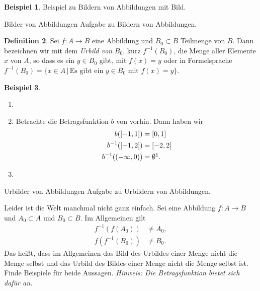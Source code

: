 \documentclass[a4paper,ngerman,12pt]{zirkelblatt1415}
\theoremstyle{definition}
\newtheorem{definition}{Definition}
\newtheorem{beispiel}[definition]{Beispiel}
\theoremstyle{remark}
\begin{document}
\begin{beispiel}
  Beispiel zu Bildern von Abbildungen mit Bild.
\end{beispiel}

\begin{aufgabe}{Bilder von Abbildungen}
  Aufgabe zu Bildern von Abbildungen.
\end{aufgabe}

\begin{definition}
Sei $f:A\longrightarrow B$ eine Abbildung und $B_0\subset B$ Teilmenge von $B$. Dann bezeichnen wir mit dem \emph{Urbild von} $B_0$, kurz $f^{-1}(B_0)$, die Menge aller Elemente 
$x$ von $A$, so dass es ein $y\in B_0$ gibt, mit $f(x)=y$ oder in Formelsprache
$f^{-1}(B_0) = \{x\in A\,|\,\text{Es gibt ein } y\in B_0 \text{ mit } f(x) =y\}.$ 
\end{definition}

\begin{beispiel}
\begin{enumerate}
\item
\item Betrachte die Betragsfunktion $b$ von vorhin. Dann haben wir
\begin{align*}
b([-1,1]) &=  [0,1] \\
b^{-1}([-1,2]) &= [-2,2]\\
b^{-1}((-\infty, 0)) &= \emptyset\footnotemark.
\end{align*}
\item
\end{enumerate}
\end{beispiel}

\begin{aufgabe}{Urbilder von Abbildungen}
  Aufgabe zu Urbildern von Abbildungen.
\end{aufgabe}

\begin{aufgabe}{Leider ist die Welt manchmal nicht ganz einfach.}
Sei eine Abbildung $f:A\longrightarrow B$ und  $A_0\subset A$ und $B_0\subset B$. Im Allgemeinen gilt 
\begin{align*}
f^{-1}\left(f\left(A_0\right)\right) &\neq A_0,\\
f\left(f^{-1}\left(B_0\right)\right) &\neq B_0.
\end{align*}
Das heißt, dass im Allgemeinen das Bild des Urbildes einer Menge nicht die Menge selbst und das Urbild des Bildes einer Menge nicht die Menge selbst ist. Finde Beispiele für beide Aussagen. \emph{Hinweis: Die Betragsfunktion bietet sich dafür an.}
\end{aufgabe}
\end{document}
